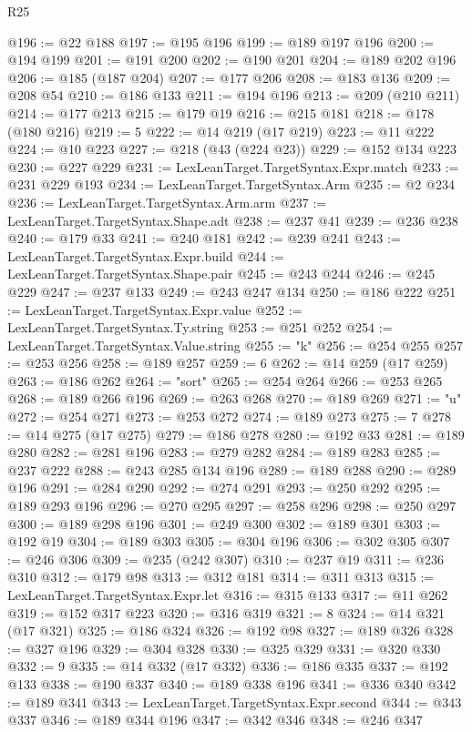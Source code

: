 \begin{lexlean}{R25}
\begin{coremodule}
@196 := @22 @188
@197 := @195 @196
@199 := @189 @197 @196
@200 := @194 @199
@201 := @191 @200
@202 := @190 @201
@204 := @189 @202 @196
@206 := @185 (@187 @204)
@207 := @177 @206
@208 := @183 @136
@209 := @208 @54
@210 := @186 @133
@211 := @194 @196
@213 := @209 (@210 @211)
@214 := @177 @213
@215 := @179 @19
@216 := @215 @181
@218 := @178 (@180 @216)
@219 := 5
@222 := @14 @219 (@17 @219)
@223 := @11 @222
@224 := @10 @223
@227 := @218 (@43 (@224 @23))
@229 := @152 @134 @223
@230 := @227 @229
@231 := LexLeanTarget.TargetSyntax.Expr.match
@233 := @231 @229 @193
@234 := LexLeanTarget.TargetSyntax.Arm
@235 := @2 @234
@236 := LexLeanTarget.TargetSyntax.Arm.arm
@237 := LexLeanTarget.TargetSyntax.Shape.adt
@238 := @237 @41
@239 := @236 @238
@240 := @179 @33
@241 := @240 @181
@242 := @239 @241
@243 := LexLeanTarget.TargetSyntax.Expr.build
@244 := LexLeanTarget.TargetSyntax.Shape.pair
@245 := @243 @244
@246 := @245 @229
@247 := @237 @133
@249 := @243 @247 @134
@250 := @186 @222
@251 := LexLeanTarget.TargetSyntax.Expr.value
@252 := LexLeanTarget.TargetSyntax.Ty.string
@253 := @251 @252
@254 := LexLeanTarget.TargetSyntax.Value.string
@255 := "k"
@256 := @254 @255
@257 := @253 @256
@258 := @189 @257
@259 := 6
@262 := @14 @259 (@17 @259)
@263 := @186 @262
@264 := "sort"
@265 := @254 @264
@266 := @253 @265
@268 := @189 @266 @196
@269 := @263 @268
@270 := @189 @269
@271 := "u"
@272 := @254 @271
@273 := @253 @272
@274 := @189 @273
@275 := 7
@278 := @14 @275 (@17 @275)
@279 := @186 @278
@280 := @192 @33
@281 := @189 @280
@282 := @281 @196
@283 := @279 @282
@284 := @189 @283
@285 := @237 @222
@288 := @243 @285 @134 @196
@289 := @189 @288
@290 := @289 @196
@291 := @284 @290
@292 := @274 @291
@293 := @250 @292
@295 := @189 @293 @196
@296 := @270 @295
@297 := @258 @296
@298 := @250 @297
@300 := @189 @298 @196
@301 := @249 @300
@302 := @189 @301
@303 := @192 @19
@304 := @189 @303
@305 := @304 @196
@306 := @302 @305
@307 := @246 @306
@309 := @235 (@242 @307)
@310 := @237 @19
@311 := @236 @310
@312 := @179 @98
@313 := @312 @181
@314 := @311 @313
@315 := LexLeanTarget.TargetSyntax.Expr.let
@316 := @315 @133
@317 := @11 @262
@319 := @152 @317 @223
@320 := @316 @319
@321 := 8
@324 := @14 @321 (@17 @321)
@325 := @186 @324
@326 := @192 @98
@327 := @189 @326
@328 := @327 @196
@329 := @304 @328
@330 := @325 @329
@331 := @320 @330
@332 := 9
@335 := @14 @332 (@17 @332)
@336 := @186 @335
@337 := @192 @133
@338 := @190 @337
@340 := @189 @338 @196
@341 := @336 @340
@342 := @189 @341
@343 := LexLeanTarget.TargetSyntax.Expr.second
@344 := @343 @337
@346 := @189 @344 @196
@347 := @342 @346
@348 := @246 @347

\end{coremodule}
\end{lexlean}
